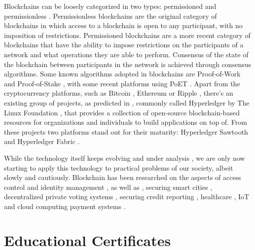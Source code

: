 Blockchains can be loosely categorized in two types: permissioned and permissionless \cite{pilkington_blockchain_2016, yaga_blockchain_2018}. Permissionless blockchains are the original category of blockchains in which access to a blockchain is open to any participant, with no imposition of restrictions. Permissioned blockchains are a more recent category of blockchains that have the ability to impose restrictions on the participants of a network and what operations they are able to perform. Consensus of the state of the blockchain between participants in the network is achieved through consensus algorithms. Some known algorithms adopted in blockchains are Proof-of-Work \cite{nakamoto_bitcoin:_2008} and Proof-of-Stake \cite{king_ppcoin:_2012}, with some recent platforms using PoET \cite{intel_poet}. Apart from the cryptocurrency platforms, such as Bitcoin  \cite{nakamoto_bitcoin:_2008}, Ethereum \cite{buterin_next-generation_2013} or Ripple \cite{schwartz_ripple_2014}, there's an existing group of projects, as predicted in \cite{buterin_next-generation_2013}, commonly called Hyperledger by The Linux Foundation \cite{linuxfoundation}, that provides a collection of open-source blockchain-based resources for organizations and individuals to build applications on top of. From these projects two platforms stand out for their maturity: Hyperledger Sawtooth \cite{hyperledger_sawtooth} and Hyperledger Fabric \cite{hyperledger_fabric}.

While the technology itself keeps evolving and under analysis \cite{eyal_bitcoin-ng:_2016, lin_survey_2017, narayanan_bitcoins_2017}, we are only now starting to apply this technology to practical problems of our society, albeit slowly and cautiously. Blockchain has been researched on the aspects of access control \cite{maesa_blockchain_2017} and identity management \cite{augot_identity_2017, yasin_online_2016}, as well as , securing smart cities \cite{biswas_securing_2016}, decentralized private voting systems \cite{sheer_hardwick_e-voting_2018}, securing credit reporting \cite{kafshdar_goharshady_secure_2018}, healthcare \cite{azaria_medrec:_2016}, IoT \cite{christidis_blockchains_2016, ouaddah_access_2017, dorri_blockchain_2017, ouaddah_fairaccess:_2017} and cloud computing payment systems \cite{zhang_blockchain_2018}.

\section{Educational Certificates}
\label{sec:related-ec}

